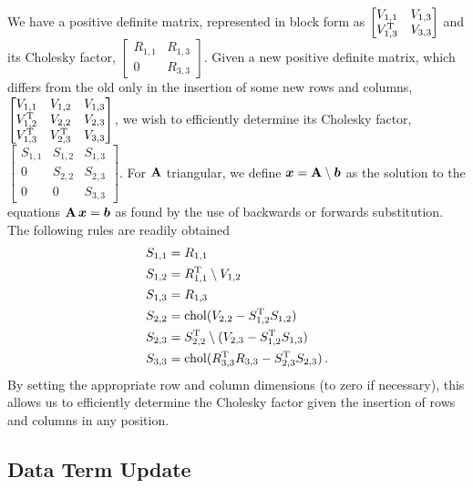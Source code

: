 \documentclass{acmsmall}
\begin{document}
\noindent We have a positive definite matrix, represented in block form as $\begin{bmatrix} V_{1,1} & V_{1,3} \\ V^{\mathrm{T}}_{1,3} & V_{3,3} \end{bmatrix}$ and its Cholesky factor, $\begin{bmatrix} R_{1,1} & R_{1,3} \\ 0 & R_{3,3} \end{bmatrix}$. Given a new positive definite matrix, which differs from the old only in the insertion of some new rows and columns,$\begin{bmatrix} V_{1,1} & V_{1,2} & V_{1,3} \\ V^{\mathrm{T}}_{1,2} & V_{2,2} & V_{2,3} \\ V^{\mathrm{T}}_{1,3} & V^{\mathrm{T}}_{2,3} & V_{3,3} \end{bmatrix}
$, we wish to efficiently determine its Cholesky factor, $\begin{bmatrix} S_{1,1} & S_{1,2} & S_{1,3} \\ 0 & S_{2,2} & S_{2,3} \\ 0 & 0 & S_{3,3} \end{bmatrix}
$. For $\mathbf{A}$ triangular, we define $\boldsymbol{x}=\mathbf{A}\setminus \boldsymbol{b}$ as the solution to the equations $\mathbf{A}\,\boldsymbol{x}=\boldsymbol{b}$ as found by the use of backwards or forwards substitution. The following rules are readily obtained
\begin{align}
 S_{1,1}&=R_{1,1}\\
S_{1,2} &=R^{\mathrm{T}}_{1,1}\setminus V_{1,2}\\
S_{1,3} &=R_{1,3}\\
S_{2,2} &=\operatorname{chol} (V_{2,2}-S^{\mathrm{T}}_{1,2}S_{1,2})\\
S_{2,3} &=S^{\mathrm{T}}_{2,2}\setminus (V_{2,3}-S^{\mathrm{T}}_{1,2}S_{1,3})\\
S_{3,3} &=\operatorname{chol} (R^{\mathrm{T}}_{3,3}R_{3,3}-S^{\mathrm{T}}_{2,3}S_{2,3}) \,.
\end{align}
By setting the appropriate row and column dimensions (to zero if necessary), this allows us to efficiently determine the Cholesky factor given the insertion of rows and columns in any position. 

\subsection{Data Term Update} \label{sec:DataTermUpdate}
\end{document}
